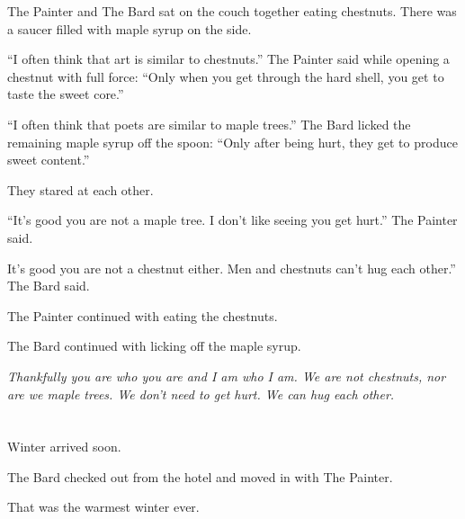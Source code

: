 \documentclass{article}
\begin{document}
The Painter and The Bard sat on the couch together eating chestnuts. There was a saucer filled with maple syrup on the side.

“I often think that art is similar to chestnuts.” The Painter said while opening a chestnut with full force: “Only when you get through the hard shell, you get to taste the sweet core.”

“I often think that poets are similar to maple trees.” The Bard licked the remaining maple syrup off the spoon: “Only after being hurt, they get to produce sweet content.”

They stared at each other.

“It's good you are not a maple tree. I don't like seeing you get hurt.” The Painter said.

It's good you are not a chestnut either. Men and chestnuts can't hug each other.” The Bard said.

The Painter continued with eating the chestnuts.

The Bard continued with licking off the maple syrup.

\textit{
Thankfully you are who you are and I am who I am. We are not chestnuts, nor are we maple trees.
We don't need to get hurt. We can hug each other.}

\section{} %
\par Winter arrived soon.
\par The Bard checked out from the hotel and moved in with The Painter.
\par That was the warmest winter ever.
\end{document}
